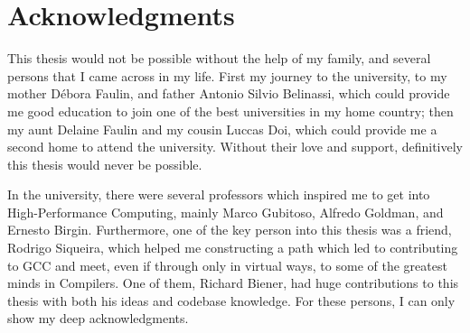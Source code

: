 



\chapter*{Acknowledgments}

This thesis would not be possible without the help of my family, and several
persons that I came across in my life. First my journey to the university, to
my mother Débora Faulin, and father Antonio Silvio Belinassi, which could
provide me good education to join one of the best universities in my home
country; then my aunt Delaine Faulin and my cousin Luccas Doi, which could
provide me a second home to attend the university. Without their love and
support, definitively this thesis would never be possible.

In the university, there were several professors which inspired me to get into
High-Performance Computing, mainly Marco Gubitoso, Alfredo Goldman, and Ernesto
Birgin. Furthermore, one of the key person into this thesis was a friend,
Rodrigo Siqueira, which helped me constructing a path which led to contributing
to GCC and meet, even if through only in virtual ways, to some of the greatest
minds in Compilers. One of them, Richard Biener, had huge contributions to this
thesis with both his ideas and codebase knowledge. For these persons, I can
only show my deep acknowledgments.

